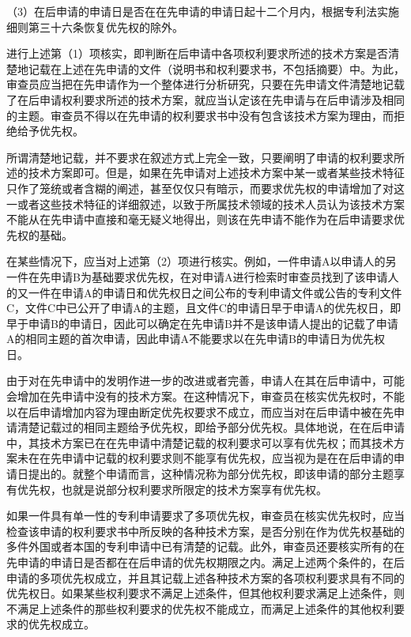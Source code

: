 {\setlength{\parindent}{17.1bp}（3）在后申请的申请日是否在在先申请的申请日起十二个月内，根据专利法实施细则第三十六条恢复优先权的除外。\par}

进行上述第（1）项核实，即判断在后申请中各项权利要求所述的技术方案是否清楚地记载在上述在先申请的文件（说明书和权利要求书，不包括摘要）中。为此，审查员应当把在先申请作为一个整体进行分析研究，只要在先申请文件清楚地记载了在后申请权利要求所述的技术方案，就应当认定该在先申请与在后申请涉及相同的主题。审查员不得以在先申请的权利要求书中没有包含该技术方案为理由，而拒绝给予优先权。

所谓清楚地记载，并不要求在叙述方式上完全一致，只要阐明了申请的权利要求所述的技术方案即可。但是，如果在先申请对上述技术方案中某一或者某些技术特征只作了笼统或者含糊的阐述，甚至仅仅只有暗示，而要求优先权的申请增加了对这一或者这些技术特征的详细叙述，以致于所属技术领域的技术人员认为该技术方案不能从在先申请中直接和毫无疑义地得出，则该在先申请不能作为在后申请要求优先权的基础。

在某些情况下，应当对上述第（2）项进行核实。例如，一件申请A以申请人的另一件在先申请B为基础要求优先权，在对申请A进行检索时审查员找到了该申请人的又一件在申请A的申请日和优先权日之间公布的专利申请文件或公告的专利文件C，文件C中已公开了申请A的主题，且文件C的申请日早于申请A的优先权日，即早于申请B的申请日，因此可以确定在先申请B并不是该申请人提出的记载了申请A的相同主题的首次申请，因此申请A不能要求以在先申请B的申请日为优先权日。

由于对在先申请中的发明作进一步的改进或者完善，申请人在其在后申请中，可能会增加在先申请中没有的技术方案。在这种情况下，审查员在核实优先权时，不能以在后申请增加内容为理由断定优先权要求不成立，而应当对在后申请中被在先申请清楚记载过的相同主题给予优先权，即给予部分优先权。具体地说，在在后申请中，其技术方案已在在先申请中清楚记载的权利要求可以享有优先权；而其技术方案未在在先申请中记载的权利要求则不能享有优先权，应当视为是在在后申请的申请日提出的。就整个申请而言，这种情况称为部分优先权，即该申请的部分主题享有优先权，也就是说部分权利要求所限定的技术方案享有优先权。

如果一件具有单一性的专利申请要求了多项优先权，审查员在核实优先权时，应当检查该申请的权利要求书中所反映的各种技术方案，是否分别在作为优先权基础的多件外国或者本国的专利申请中已有清楚的记载。此外，审查员还要核实所有的在先申请的申请日是否都在在后申请的优先权期限之内。满足上述两个条件的，在后申请的多项优先权成立，并且其记载上述各种技术方案的各项权利要求具有不同的优先权日。如果某些权利要求不满足上述条件，但其他权利要求满足上述条件，则不满足上述条件的那些权利要求的优先权不能成立，而满足上述条件的其他权利要求的优先权成立。

